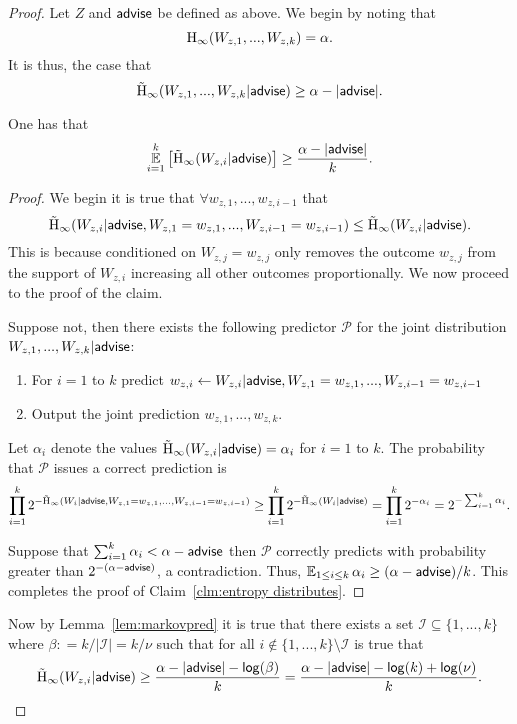 \begin{proof}
Let $Z$ and ${\mathsf{advise}}$ be defined as above. We begin by noting that \[
\mathrm{H}_\infty(W_{z, 1},..., W_{z, k})=\alpha.\]
 It is thus, the case that 
\[
\tilde{\mathrm{H}}_\infty(W_{z, 1},..., W_{z, k} | {\mathsf{advise}}) \ge \alpha - |{\mathsf{advise}}|.
\]
\begin{claim}
One has that 
\begin{align*}
\operatorname*{\mathbb{E}}_{i=1}^k \left[\tilde{\mathrm{H}}_\infty(W_{z, i} | {\mathsf{advise}})\right] \ge \frac{\alpha - |{\mathsf{advise}}|}{k}.
\end{align*}
\label{clm:entropy distributes}
\end{claim}
\begin{proof}
We begin it is true that $\forall w_{z,1},..., w_{z,i-1}$ that 
\[
\tilde{\mathrm{H}}_\infty(W_{z,i} | {\mathsf{advise}}, W_{z, 1}=w_{z,1},..., W_{z,i-1}=w_{z,i-1}) \le \tilde{\mathrm{H}}_\infty(W_{z,i} | {\mathsf{advise}}).
\]
This is because conditioned on $W_{z, j} =w_{z,j}$ only removes the outcome $w_{z,j}$ from the support of $W_{z,i}$ increasing all other outcomes proportionally.  
We now proceed to the proof of the claim. 

Suppose not, then there exists the following predictor $\mathcal{P}$ for the joint distribution $W_{z, 1},..., W_{z, k} | {\mathsf{advise}}$:
\begin{enumerate}
\item For $i=1$ to $k$ predict $w_{z,i}\leftarrow W_{z, i}| {\mathsf{advise}}, W_{z,1}=w_{z,1},..., W_{z,i-1}=w_{z,i-1}$
\item Output the joint prediction $w_{z,1},..., w_{z, k}$.  
\end{enumerate}
Let $\alpha_i$ denote the values $\tilde{\mathrm{H}}_\infty(W_{z,i}| {\mathsf{advise}}) = \alpha_i$ for $i=1$ to $k$. 
The probability that $\mathcal{P}$ issues a correct prediction is
\begin{align*}
\prod_{i=1}^k 2^{-\tilde{\mathrm{H}}_\infty(W_i | {\mathsf{advise}},  W_{z,1}=w_{z,1},..., W_{z,i-1}=w_{z,i-1})} \ge \prod_{i=1}^k 2^{-\tilde{\mathrm{H}}_\infty(W_i | {\mathsf{advise}})} = \prod_{i=1}^k 2^{-\alpha_i}  = 2^{-\sum_{i=1}^k \alpha_i}.
\end{align*}

\noindent
Suppose that $\sum_{i=1}^k \alpha_i < \alpha-{\mathsf{advise}}$ then $\mathcal{P}$ correctly predicts with probability greater than $2^{-(\alpha-{\mathsf{advise}})}$, a contradiction.  Thus, $\operatorname*{\mathbb{E}}_{1\le i\le k} \alpha_i \ge (\alpha-{\mathsf{advise}})/k$. 
This completes the proof of Claim~\ref{clm:entropy distributes}.
\end{proof}

\noindent
Now by Lemma~\ref{lem:markovpred} it is true that there exists a set $\mathcal{I}\subseteq \{1,...,k\}$ where $\beta: =  k/| \mathcal{I} | = k/\nu$ such that for all $i\not \in \{1,...,k\} \setminus\mathcal{I}$ is true that 
\[
\tilde{\mathrm{H}}_\infty(W_{z,i} | {\mathsf{advise}}) \ge \frac{\alpha -|{\mathsf{advise}}| - \mathsf{log}\!\left(\beta\right)}{k} = \frac{\alpha -|{\mathsf{advise}}| - \mathsf{log}\!\left(k\right) + \mathsf{log}\!\left(\nu\right)}{k}.
\]


\end{proof}
